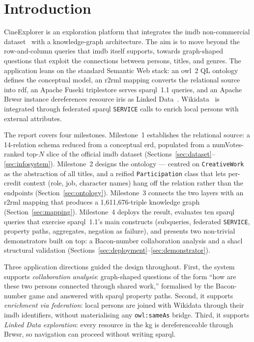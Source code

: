 \newpage
\section{Introduction}

CineExplorer is an exploration platform that integrates the \ac{imdb} non-commercial dataset~\cite{imdb-noncommercial} with a knowledge-graph architecture. The aim is to move beyond the row-and-column queries that \ac{imdb} itself supports, towards graph-shaped questions that exploit the connections between persons, titles, and genres. The application leans on the standard Semantic Web stack: an \ac{owl}~2 QL ontology defines the conceptual model, an \ac{r2rml} mapping converts the relational source into \ac{rdf}, an Apache Fuseki triplestore serves \ac{sparql}~1.1 queries, and an Apache Brwsr instance dereferences resource \acp{iri} as Linked Data~\cite{cooluris}. Wikidata~\cite{wikidata} is integrated through federated \ac{sparql} \texttt{SERVICE} calls to enrich local persons with external attributes.

The report covers four milestones. Milestone~1 establishes the relational source: a 14-relation schema reduced from a conceptual \ac{erd}, populated from a numVotes-ranked top-$N$ slice of the official \ac{imdb} dataset (Sections~\ref{sec:dataset}--\ref{sec:infosystem}). Milestone~2 designs the ontology --- centred on \texttt{CreativeWork} as the abstraction of all titles, and a reified \texttt{Participation} class that lets per-credit context (role, job, character names) hang off the relation rather than the endpoints (Section~\ref{sec:ontology}). Milestone~3 connects the two layers with an \ac{r2rml} mapping that produces a 1{,}611{,}676-triple knowledge graph (Section~\ref{sec:mapping}). Milestone~4 deploys the result, evaluates ten \ac{sparql} queries that exercise \ac{sparql}~1.1's main constructs (subqueries, federated \texttt{SERVICE}, property paths, aggregates, negation as failure), and presents two non-trivial demonstrators built on top: a Bacon-number collaboration analysis and a \ac{shacl} structural validation (Sections~\ref{sec:deployment}--\ref{sec:demonstrator}).

Three application directions guided the design throughout. First, the system supports \emph{collaboration analysis}: graph-shaped questions of the form ``how are these two persons connected through shared work,'' formalised by the Bacon-number game and answered with \ac{sparql} property paths. Second, it supports \emph{enrichment via federation}: local persons are joined with Wikidata through their \ac{imdb} identifiers, without materialising any \texttt{owl:sameAs} bridge. Third, it supports \emph{Linked Data exploration}: every resource in the \ac{kg} is dereferenceable through Brwsr, so navigation can proceed without writing \ac{sparql}.
